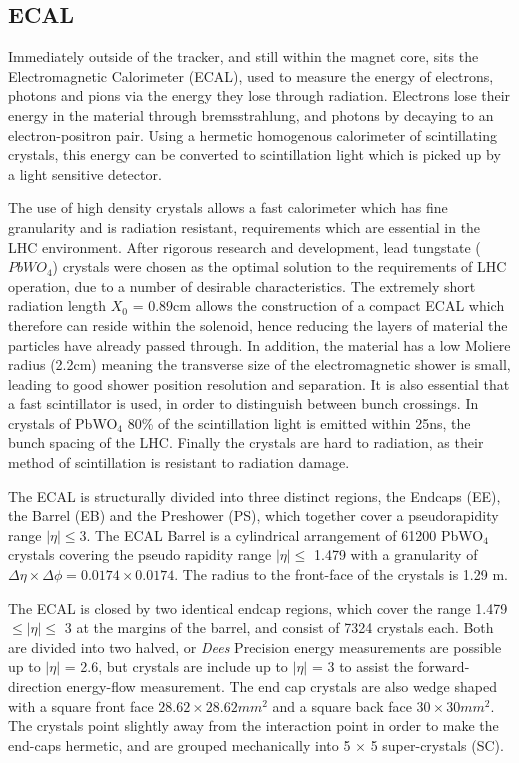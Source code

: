 \subsection{ECAL}

Immediately outside of the tracker, and still within the magnet core, sits the Electromagnetic Calorimeter (ECAL), used to measure the energy of electrons, photons and pions via the energy they lose through radiation. Electrons lose their energy in the material through bremsstrahlung, and photons by decaying to an electron-positron pair. Using a hermetic homogenous calorimeter of scintillating crystals, this energy can be converted to scintillation light which is picked up by a light sensitive detector. 

The use of high density crystals allows a fast calorimeter which has fine granularity and is radiation resistant, requirements which are essential in the LHC environment. After rigorous research and development, lead tungstate ($PbWO_{4}$) crystals were chosen as the optimal solution to the requirements of LHC operation, due to a number of desirable characteristics. The extremely short radiation length $X_{0}$ = 0.89cm allows the construction of a compact ECAL which therefore can reside within the solenoid, hence reducing the layers of material the particles have already passed through. In addition, the material has a low Moliere radius (2.2cm) meaning the transverse size of the electromagnetic shower is small, leading to good shower position resolution and separation. It is also essential that a fast scintillator is used, in order to distinguish between bunch crossings. In crystals of PbWO$_{4}$ 80\% of the scintillation light is emitted within 25ns, the bunch spacing of the LHC. Finally the crystals are hard to radiation, as their method of scintillation is resistant to radiation damage. 

The ECAL is structurally divided into three distinct regions, the Endcaps (EE), the Barrel (EB) and the Preshower (PS), which together cover a pseudorapidity range $|\eta| \leq$3. The ECAL Barrel is a cylindrical arrangement of 61200 PbWO$_{4}$ crystals covering the pseudo rapidity range $|\eta| \leq$ 1.479 with a granularity of $\Delta \eta \times \Delta \phi = 0.0174 \times 0.0174$. The radius to the front-face of the crystals is 1.29 m. 


The ECAL is closed by two identical endcap regions, which cover the range 1.479 $\leq |\eta| \leq$ 3 at the margins of the barrel, and consist of 7324 crystals each. Both are divided into two halved, or \textit{Dees} Precision energy measurements are possible up to $|\eta|$ = 2.6, but crystals are include up to $|\eta|$ = 3 to assist the forward-direction energy-flow measurement. The end cap crystals are also wedge shaped with a square front face $28.62 \times 28.62 mm^{2}$ and a square back face $30 \times 30 mm^{2}$. The crystals point slightly away from the interaction point in order to make the end-caps hermetic, and are grouped mechanically into 5 $\times$ 5 super-crystals (SC). 

